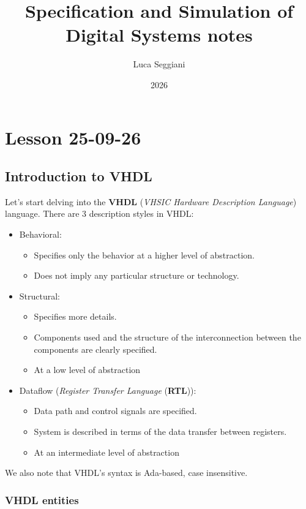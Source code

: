 \documentclass[a4paper,11pt]{article}
\title{Specification and Simulation of Digital Systems notes}
\author{Luca Seggiani}
\date{2026}
\begin{document}
\section{Lesson 25-09-26}

\thispagestyle{empty}
\pagestyle{fancy}

\subsection{Introduction to VHDL}

Let's start delving into the \textbf{VHDL} (\textit{VHSIC Hardware Description Language}) language.
There are 3 description styles in VHDL:
\begin{itemize}
	\item
	      Behavioral:
	      \begin{itemize}
		      \item Specifies only the behavior at a higher level of abstraction.
		      \item Does not imply any particular structure or technology.
	      \end{itemize}
	\item
	      Structural:
	      \begin{itemize}
		      \item Specifies more details.
		      \item Components used and the structure of the interconnection between the components are clearly specified.
		      \item At a low level of abstraction
	      \end{itemize}
	\item
	      Dataflow (\textit{Register Transfer Language} (\textbf{RTL})):
	      \begin{itemize}
		      \item Data path and control signals are specified.
		      \item System is described in terms of the data transfer between registers.
		      \item At an intermediate level of abstraction
	      \end{itemize}
\end{itemize}

We also note that VHDL's syntax is Ada-based, case insensitive.

\subsubsection{VHDL entities}
\end{document}
